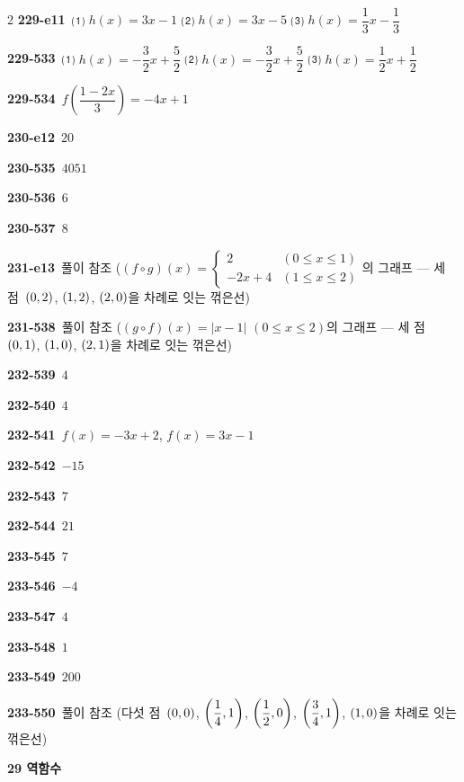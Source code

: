 \documentclass[10pt,a4paper]{article}
\begin{document}
\begin{multicols}{2}
\noindent\textbf{229-e11}\ ⑴ $h(x)=3x-1$ ⑵ $h(x)=3x-5$ ⑶ $h(x)=\dfrac{1}{3}x-\dfrac{1}{3}$\par
\noindent\textbf{229-533}\ ⑴ $h(x)=-\dfrac{3}{2}x+\dfrac{5}{2}$ ⑵ $h(x)=-\dfrac{3}{2}x+\dfrac{5}{2}$ ⑶ $h(x)=\dfrac{1}{2}x+\dfrac{1}{2}$\par
\noindent\textbf{229-534}\ $f\!\left(\dfrac{1-2x}{3}\right)=-4x+1$\par
\noindent\textbf{230-e12}\ $20$\par
\noindent\textbf{230-535}\ $4051$\par
\noindent\textbf{230-536}\ $6$\par
\noindent\textbf{230-537}\ $8$\par
\noindent\textbf{231-e13}\ 풀이 참조 ($(f\circ g)(x)=\begin{cases} 2 & (0\le x\le 1) \\ -2x+4 & (1\le x\le 2) \end{cases}$의 그래프 — 세 점~$(0{,}\mkern3mu\mathopen{}2)$, $(1{,}\mkern3mu\mathopen{}2)$, $(2{,}\mkern3mu\mathopen{}0)$을 차례로 잇는 꺾은선)\par
\noindent\textbf{231-538}\ 풀이 참조 ($(g\circ f)(x)=|x-1|$ $(0\le x\le 2)$의 그래프 — 세 점~$(0{,}\mkern3mu\mathopen{}1)$, $(1{,}\mkern3mu\mathopen{}0)$, $(2{,}\mkern3mu\mathopen{}1)$을 차례로 잇는 꺾은선)\par
\noindent\textbf{232-539}\ $4$\par
\noindent\textbf{232-540}\ $4$\par
\noindent\textbf{232-541}\ $f(x)=-3x+2$, $f(x)=3x-1$\par
\noindent\textbf{232-542}\ $-15$\par
\noindent\textbf{232-543}\ $7$\par
\noindent\textbf{232-544}\ $21$\par
\noindent\textbf{233-545}\ $7$\par
\noindent\textbf{233-546}\ $-4$\par
\noindent\textbf{233-547}\ $4$\par
\noindent\textbf{233-548}\ $1$\par
\noindent\textbf{233-549}\ $200$\par
\noindent\textbf{233-550}\ 풀이 참조 (다섯 점~$(0{,}\mkern3mu\mathopen{}0)$, $\left(\dfrac{1}{4}{,}\mkern3mu\mathopen{}1\right)$, $\left(\dfrac{1}{2}{,}\mkern3mu\mathopen{}0\right)$, $\left(\dfrac{3}{4}{,}\mkern3mu\mathopen{}1\right)$, $(1{,}\mkern3mu\mathopen{}0)$을 차례로 잇는 꺾은선)\par
\noindent\textbf{29 역함수}\par\smallskip

\end{multicols}
\end{document}
